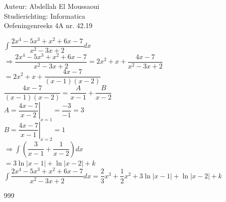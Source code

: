 \documentclass[a4paper]{article}
\begin{document}
  
\noindent \large Auteur: Abdellah El Moussaoui \\
\noindent \large Studierichting: Informatica\\
\noindent \large Oefeningenreeks 4A nr. 42.19\\

\medskip

\normalsize

$\displaystyle\int \dfrac{2x^4-5x^3+x^2+6x-7}{x^2-3x+2}dx$\\

$\Rightarrow \dfrac{2x^4-5x^3+x^2+6x-7}{x^2-3x+2}
= 2x^2 + x + \dfrac{4x-7}{x^2-3x+2}$\\

$ = 2x^2+x+\dfrac{4x-7}{\left(x-1\right)\left(x-2\right)} $\\

$\dfrac{4x-7}{\left(x-1\right)\left(x-2\right)} = \dfrac{A}{x-1} + \dfrac{B}{x-2}$\\

$A = \left. \dfrac{4x-7}{x-2}\right|_{x=1}=\dfrac{-3}{-1}=3$\\

$B = \left. \dfrac{4x-7}{x-1}\right|_{x=2}=1$\\

$\Rightarrow \displaystyle\int \left(\dfrac{3}{x-1} + \dfrac{1}{x-2}\right)dx$\\


$= 3\ln{\left|x-1\right|}+\ln{\left|x-2\right|}+k$\\

$\boxed{\displaystyle\int \dfrac{2x^4-5x^3+x^2+6x-7}{x^2-3x+2}dx = \dfrac{2}{3}x^3+\dfrac{1}{2}x^2+3\ln{\left|x-1\right|}+\ln{\left|x-2\right|}+k}$\\


\begin{thebibliography}{999}
\end{thebibliography}
\end{document}
